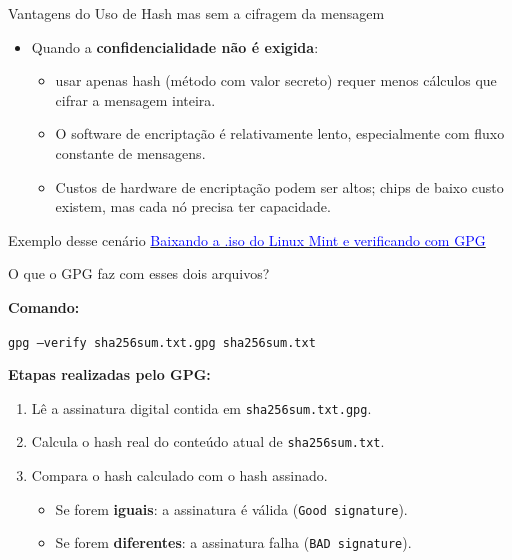 \begin{frame}{Vantagens do Uso de Hash mas sem a cifragem da mensagem}
    \begin{itemize}
        \item Quando a \textbf{confidencialidade não é exigida}:
        \begin{itemize}
            \item usar apenas hash (método com valor secreto) requer menos cálculos que cifrar a mensagem inteira.
            \item O software de encriptação é relativamente lento, especialmente com fluxo constante de mensagens.
            \item Custos de hardware de encriptação podem ser altos; chips de baixo custo existem, mas cada nó precisa ter capacidade.
        \end{itemize} 
    \end{itemize}

    \begin{block}{Exemplo desse cenário}
        \href{https://www.linuxmint.com/edition.php?id=322}{\textcolor{blue}{Baixando a .iso do Linux Mint e verificando com GPG}}
        
    \end{block}
\end{frame}

\begin{frame}{O que o GPG faz com esses dois arquivos?}

\textbf{Comando:}
\begin{block}{}
\texttt{gpg --verify sha256sum.txt.gpg sha256sum.txt}
\end{block}

\textbf{Etapas realizadas pelo GPG:}
\begin{enumerate}
    \item Lê a assinatura digital contida em \texttt{sha256sum.txt.gpg}.
    \item Calcula o hash real do conteúdo atual de \texttt{sha256sum.txt}.
    \item Compara o hash calculado com o hash assinado.
    \begin{itemize}
        \item Se forem \textbf{iguais}: a assinatura é válida (\texttt{Good signature}).
        \item Se forem \textbf{diferentes}: a assinatura falha (\texttt{BAD signature}).
    \end{itemize}
\end{enumerate}

\end{frame}


